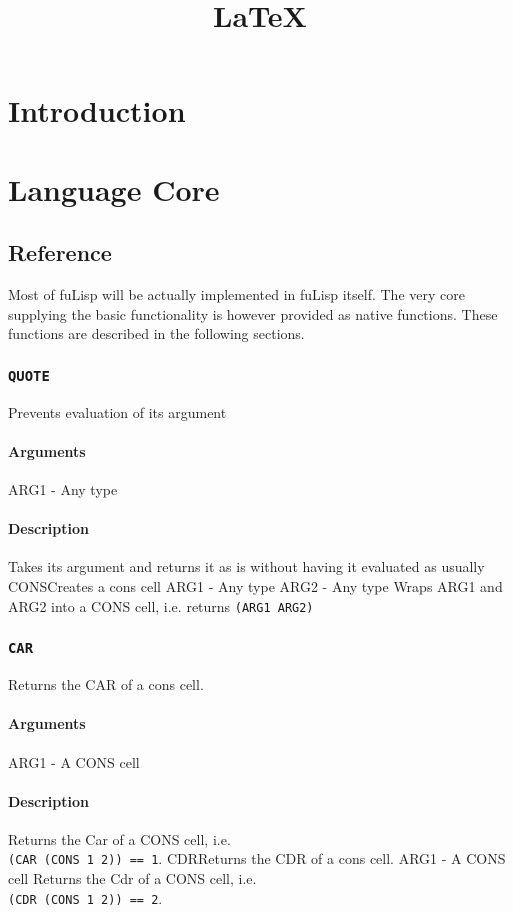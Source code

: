 \documentclass[12pt]{article}
\title{\LaTeX}
\date{}
\newcommand{\commandDescription}[5]{
    \subsubsection{\texttt{#1}}
    #2
    \paragraph{Arguments}
    #3
    \paragraph{Description}
    #4
}
\begin{document}

\section{Introduction}



\section{Language Core}

\subsection{\label{sec:CoreReference}Reference}

Most of fuLisp will be actually implemented in fuLisp itself. 
The very core supplying the basic functionality is however provided as native
functions.
These functions are described in the following sections.

\commandDescription{QUOTE}{Prevents evaluation of its argument}
{ARG1 - Any type}
{Takes its argument and returns it as is without having it evaluated as usually}

\commandDescription{CONS}{Creates a cons cell}
{ARG1 - Any type  ARG2 - Any type}
{Wraps ARG1 and ARG2 into a CONS cell, i.e. returns \texttt{(ARG1 ARG2)}}

\commandDescription{CAR}{Returns the CAR of a cons cell.}
{ARG1 - A CONS cell}
{Returns the Car of a CONS cell, i.e.  \\\texttt{(CAR (CONS 1 2)) == 1}.}

\commandDescription{CDR}{Returns the CDR of a cons cell.}
{ARG1 - A CONS cell}
{Returns the Cdr of a CONS cell, i.e. \\\texttt{(CDR (CONS 1 2)) == 2}.}
\end{document}
